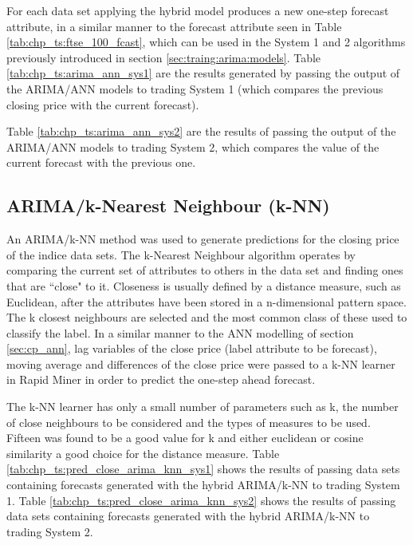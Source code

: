 For each data set applying the hybrid model produces a new one-step forecast attribute, in a similar manner to the forecast attribute seen in Table \ref{tab:chp_ts:ftse_100_fcast}, which can be used in the System 1 and 2 algorithms previously introduced in section \ref{sec:traing:arima:models}. Table \ref{tab:chp_ts:arima_ann_sys1} are the results generated by passing the output of the ARIMA/ANN models to trading System 1 (which compares the previous closing price with the current forecast).

\label{todo:chp5:tab:chp_ts:arima_hybrid_reg}



Table \ref{tab:chp_ts:arima_ann_sys2} are the results of passing the output of the ARIMA/ANN models to trading System 2, which compares the value of the current forecast with the previous one.



\subsection{ARIMA/k-Nearest Neighbour (k-NN)}
An ARIMA/k-NN method was used to generate predictions for the closing price of the indice data sets. The k-Nearest Neighbour algorithm operates by comparing the current set of attributes to others in the data set and finding ones that are \textquotedblleft close" to it. Closeness is usually defined by a distance measure, such as Euclidean, after the attributes have been stored in a n-dimensional pattern space. The k closest neighbours are selected and the most common class of these used to classify the label. In a similar manner to the ANN modelling of section \ref{sec:cp_ann}, lag variables of the close price (label attribute to be forecast), moving average and differences of the close price were passed to a k-NN learner in Rapid Miner in order to predict the one-step ahead forecast. 

The k-NN learner has only a small number of parameters such as k, the number of close neighbours to be considered and the types of measures to be used. Fifteen was found to be a good value for k and either euclidean or cosine similarity a good choice for the distance measure. Table \ref{tab:chp_ts:pred_close_arima_knn_sys1} shows the results of passing data sets containing forecasts generated with the hybrid ARIMA/k-NN to trading System 1. Table \ref{tab:chp_ts:pred_close_arima_knn_sys2} shows the results of passing data sets containing forecasts generated with the hybrid ARIMA/k-NN to trading System 2.

